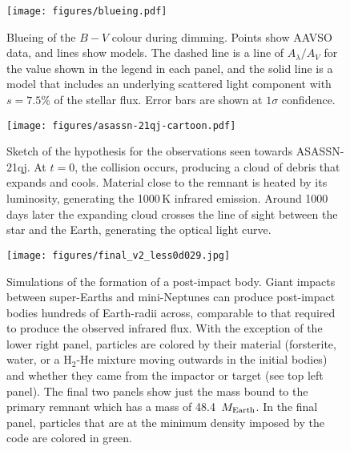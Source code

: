 \documentclass[sn-nature]{sn-jnl}%
\begin{document}
\begin{figure}
    \centering
\texttt{[image: figures/blueing.pdf]}
    \caption{Blueing of the $B-V$ colour during dimming.
    Points show AAVSO data, and lines show models.
    The dashed line is a line of $A_\lambda/A_V$ for the value shown in the legend in each panel, and the solid line is a model that includes an underlying scattered light component with $s=7.5$\% of the stellar flux.
    Error bars are shown at $1\sigma$ confidence.
}
    \label{fig:blueing}
\end{figure}

\begin{figure}
    \centering
\texttt{[image: figures/asassn-21qj-cartoon.pdf]}
    \caption{Sketch of the hypothesis for the observations seen towards ASASSN-21qj.
    At $t=0$, the collision occurs, producing a cloud of debris that expands and cools.
    Material close to the remnant is heated by its luminosity, generating the 1000\,K infrared emission.
    Around 1000 days later the expanding cloud crosses the line of sight between the star and the Earth, generating the optical light curve.}
    \label{fig:hypothesis}
\end{figure}


\begin{figure}
    \centering
\texttt{[image: figures/final\_v2\_less0d029.jpg]}
    \caption{Simulations of the formation of a post-impact body.
    Giant impacts between super-Earths and mini-Neptunes can produce post-impact bodies hundreds of Earth-radii across, comparable to that required to produce the observed infrared flux. With the exception of the lower right panel, particles are colored by their material (forsterite, water, or a H$_2$-He mixture moving outwards in the initial bodies) and whether they came from the impactor or target (see top left panel). The final two panels show just the mass bound to the primary remnant which has a mass of 48.4~$M_{\rm Earth}$. In the final panel, particles that are at the minimum density imposed by the code are colored in green.}
    \label{fig:SPH}
\end{figure}
\end{document}
